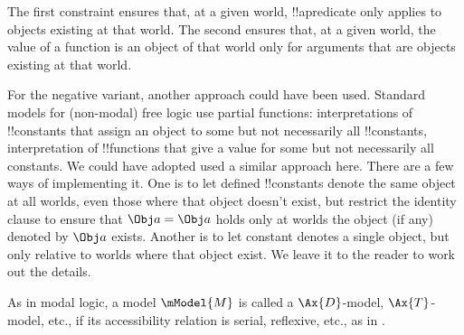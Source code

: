 \documentclass[../../../include/open-logic-section]{subfiles}
\begin{document}
\begin{explain}
  The first constraint ensures that, at a given world, !!a{predicate}
  only applies to objects existing at that world. The second ensures
  that, at a given world, the value of a function is an object of 
  that world only for arguments that are objects existing 
  at that world. 
\end{explain}

\begin{rem} %
  For the negative variant, another approach could have 
  been used. Standard models for (non-modal) free logic use 
partial functions: interpretations of !!{constant}s 
that assign an object to some but not necessarily all !!{constant}s, 
interpretation of !!{function}s that give a value for 
some but not necessarily all constants. We could have 
adopted used a similar approach here. There are a 
few ways of implementing it. One is to let defined
!!{constant}s denote the same object at all worlds, even 
those where that object doesn't exist, but restrict
the identity clause to ensure that $\Obj a=\Obj a$ holds 
only at worlds the object (if any) denoted by $\Obj a$ 
exists. Another is to let constant denotes a single 
object, but only relative to worlds where that object
exist. We leave it to the reader to work out the details.
\end{rem}

\begin{rem}
  As in modal logic, a model $\mModel{M}$ is called a $\Ax{D}$-model, 
  $\Ax{T}$-model, etc., if its accessibility relation is serial,
  reflexive, etc., as in . 
\end{rem}
\end{document}
